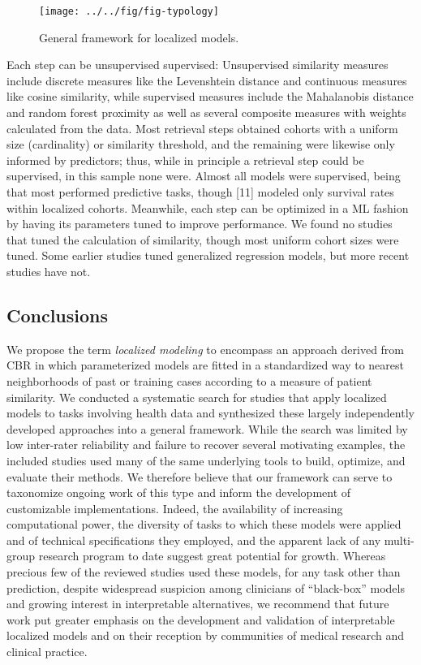 \documentclass[preprint, 3p,
authoryear]{elsarticle} %
\begin{document}
\begin{figure}

{\centering \texttt{[image: ../../fig/fig-typology]} 

}

\caption{\label{fig:framework}General framework for localized models.}\label{fig:fig:framework}
\end{figure}

Each step can be unsupervised supervised: Unsupervised similarity
measures include discrete measures like the Levenshtein distance and
continuous measures like cosine similarity, while supervised measures
include the Mahalanobis distance and random forest proximity as well as
several composite measures with weights calculated from the data. Most
retrieval steps obtained cohorts with a uniform size (cardinality) or
similarity threshold, and the remaining were likewise only informed by
predictors; thus, while in principle a retrieval step could be
supervised, in this sample none were. Almost all models were supervised,
being that most performed predictive tasks, though {[}11{]} modeled only
survival rates within localized cohorts. Meanwhile, each step can be
optimized in a ML fashion by having its parameters tuned to improve
performance. We found no studies that tuned the calculation of
similarity, though most uniform cohort sizes were tuned. Some earlier
studies tuned generalized regression models, but more recent studies
have not.

\hypertarget{conclusions}{%
\subsection{Conclusions}\label{conclusions}}

We propose the term \emph{localized modeling} to encompass an approach
derived from CBR in which parameterized models are fitted in a
standardized way to nearest neighborhoods of past or training cases
according to a measure of patient similarity. We conducted a systematic
search for studies that apply localized models to tasks involving health
data and synthesized these largely independently developed approaches
into a general framework. While the search was limited by low
inter-rater reliability and failure to recover several motivating
examples, the included studies used many of the same underlying tools to
build, optimize, and evaluate their methods. We therefore believe that
our framework can serve to taxonomize ongoing work of this type and
inform the development of customizable implementations. Indeed, the
availability of increasing computational power, the diversity of tasks
to which these models were applied and of technical specifications they
employed, and the apparent lack of any multi-group research program to
date suggest great potential for growth. Whereas precious few of the
reviewed studies used these models, for any task other than prediction,
despite widespread suspicion among clinicians of ``black-box'' models
and growing interest in interpretable alternatives, we recommend that
future work put greater emphasis on the development and validation of
interpretable localized models and on their reception by communities of
medical research and clinical practice.
\end{document}
